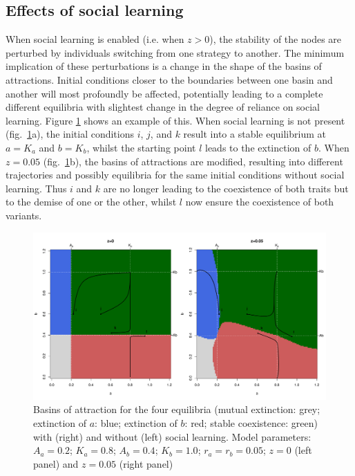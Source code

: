 \documentclass[preprint,authoryear]{elsarticle}
\begin{document}
\subsection{Effects of social learning}

When social learning is enabled (i.e. when $z>0$), the stability of the nodes are perturbed by individuals switching from one strategy to another. The minimum implication of these perturbations is a change in the shape of the basins of attractions. Initial conditions closer to the boundaries between one basin and another will most profoundly be affected, potentially leading to a complete different equilibria with slightest change in the degree of reliance on social learning. Figure \ref{fig:TransmissionBasin} shows an example of this. When social learning is not present (fig.~\ref{fig:TransmissionBasin}a), the initial conditions $i$, $j$, and $k$ result into a stable equilibrium at $a=K_a$ and $b=K_b$, whilst the starting point $l$ leads to the extinction of $b$. When $z=0.05$ (fig.~\ref{fig:TransmissionBasin}b), the basins of attractions are modified, resulting into different trajectories and possibly equilibria for the same initial conditions without social learning. Thus $i$ and $k$ are no longer leading to the coexistence of both traits but to the demise of one or the other, whilst $l$ now ensure the coexistence of both variants. 

\begin{figure}[h!]
  \centering
      \includegraphics[width=\textwidth]{./figures/figure3.pdf}
  \caption{Basins of attraction for the four equilibria (mutual extinction: grey; extinction of $a$: blue; extinction of $b$: red; stable coexistence: green) with (right) and without (left) social learning. Model parameters: $A_a=0.2$; $K_a=0.8$; $A_b=0.4$; $K_b=1.0$; $r_a=r_b=0.05$; $z=0$ (left panel) and $z=0.05$ (right panel) }
    \label{fig:TransmissionBasin}
\end{figure}
\end{document}
